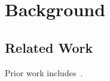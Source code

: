 \chapter{Background}
\label{ch:background}

\section{Related Work}
Prior work includes~\cite{knuth1984}.
